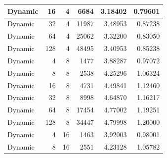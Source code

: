 \documentclass[journal,transmag]{IEEEtran}
\begin{document}
\begin{table}[h]
\begin{tabular}{|l|r|r|r|r|r|}
		Dynamic       & 16                           & 4                            & 6684                              & 3.18402                       & 0.79601                         \\ \hline
		Dynamic       & 32                           & 4                            & 11987                             & 3.48953                       & 0.87238                         \\ \hline
		Dynamic       & 64                           & 4                            & 25062                             & 3.32200                       & 0.83050                         \\ \hline
		Dynamic       & 128                          & 4                            & 48495                             & 3.40953                       & 0.85238                         \\ \hline
		Dynamic       & 4                            & 8                            & 1477                              & 3.88287                       & 0.97072                         \\ \hline
		Dynamic       & 8                            & 8                            & 2538                              & 4.25296                       & 1.06324                         \\ \hline
		Dynamic       & 16                           & 8                            & 4731                              & 4.49841                       & 1.12460                         \\ \hline
		Dynamic       & 32                           & 8                            & 8998                              & 4.64870                       & 1.16217                         \\ \hline
		Dynamic       & 64                           & 8                            & 17454                             & 4.77002                       & 1.19251                         \\ \hline
		Dynamic       & 128                          & 8                            & 34447                             & 4.79998                       & 1.20000                         \\ \hline
		Dynamic       & 4                            & 16                           & 1463                              & 3.92003                       & 0.98001                         \\ \hline
		Dynamic       & 8                            & 16                           & 2551                              & 4.23128                       & 1.05782                         \\ \hline

\end{tabular}
\end{table}
\end{document}
